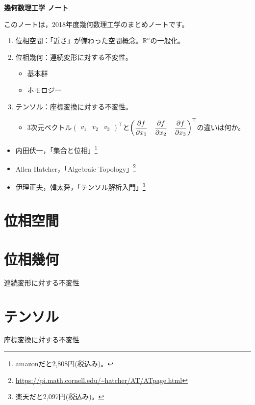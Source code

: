 \documentclass[uplatex]{jsarticle}
\newcommand{\octopuspart}[1]{\newpage\part{#1}\setcounter{section}{0}\vspace{3\baselineskip}}
\begin{document}
\begin{center}{\LARGE \bf 幾何数理工学 ノート}\end{center}

このノートは，2018年度幾何数理工学のまとめノートです。
\begin{enumerate}
    \item 位相空間：「近さ」が備わった空間概念。$\mathbb{R}^{n}$の一般化。
    \item 位相幾何：連続変形に対する不変性。
    \begin{itemize}
        \item 基本群
        \item ホモロジー
    \end{itemize}
    \item テンソル：座標変換に対する不変性。
    \begin{itemize}
        \item 3次元ベクトル${\displaystyle \begin{pmatrix}
            v_{1} & v_{2} & v_{3} 
        \end{pmatrix}^{\top}}$と${\displaystyle \begin{pmatrix}
            \dfrac{\partial f}{\partial x_{1}} & \dfrac{\partial f}{\partial x_{2}} & \dfrac{\partial f}{\partial x_{3}}
        \end{pmatrix}^{\top}}$の違いは何か。
    \end{itemize}
\end{enumerate}

\begin{itemize}
    \item 内田伏一，「集合と位相」\footnote{amazonだと2,808円(税込み)。}
    \item Allen Hatcher，「Algebraic Topology」\footnote{\url{https://pi.math.cornell.edu/~hatcher/AT/ATpage.html}}
    \item 伊理正夫，韓太舜，「テンソル解析入門」\footnote{楽天だと2,097円(税込み)。}
\end{itemize}

\renewcommand{\baselinestretch}{0.1}
\tableofcontents
\renewcommand{\baselinestretch}{1.0}

\octopuspart{位相空間}

\octopuspart{位相幾何}
連続変形に対する不変性


\octopuspart{テンソル}
座標変換に対する不変性

\end{document}
